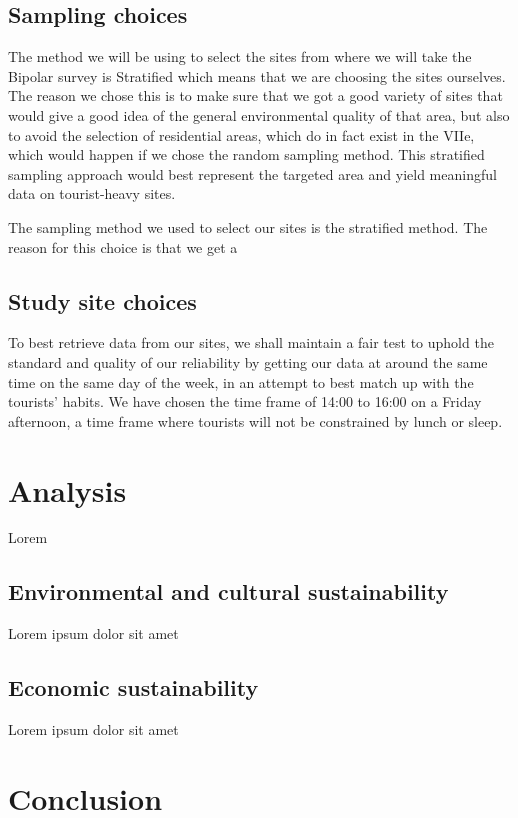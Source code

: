 \documentclass[11pt,letterpaper]{article}
\begin{document}
\subsection{Sampling choices}

The method we will be using to select the sites from where we will take the Bipolar survey is Stratified which means that we are choosing the sites ourselves. The reason we chose this is to make sure that we got a good variety of sites that would give a good idea of the general environmental quality of that area, but also to avoid the selection of residential areas, which do in fact exist in the VIIe, which would happen if we chose the random sampling method. This stratified sampling approach would best represent the targeted area and yield meaningful data on tourist-heavy sites.

The sampling method we used to select our sites is the stratified method. The reason for this choice is that we get a

\subsection{Study site choices}

To best retrieve data from our sites, we shall maintain a fair test to uphold the standard and quality of our reliability by getting our data at around the same time on the same day of the week, in an attempt to best match up with the tourists’ habits. We have chosen the time frame of 14:00 to 16:00 on a Friday afternoon, a time frame where tourists will not be constrained by lunch or sleep.

\section{Analysis}

Lorem

\subsection{Environmental and cultural sustainability}
Lorem ipsum dolor sit amet

\subsection{Economic sustainability}
Lorem ipsum dolor sit amet

\section{Conclusion}
\end{document}
